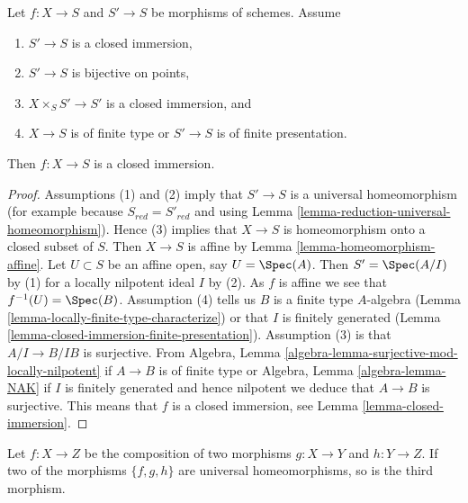 \begin{lemma}
\label{lemma-check-closed-infinitesimally}
Let $f : X \to S$ and $S' \to S$ be morphisms of schemes.
Assume
\begin{enumerate}
\item $S' \to S$ is a closed immersion,
\item $S' \to S$ is bijective on points,
\item $X \times_S S' \to S'$ is a closed immersion, and
\item $X \to S$ is of finite type or $S' \to S$ is of finite presentation.
\end{enumerate}
Then $f : X \to S$ is a closed immersion.
\end{lemma}

\begin{proof}
Assumptions (1) and (2) imply that $S' \to S$ is a universal homeomorphism
(for example because $S_{red} = S'_{red}$ and using
Lemma \ref{lemma-reduction-universal-homeomorphism}).
Hence (3) implies that $X \to S$ is homeomorphism onto a
closed subset of $S$. Then $X \to S$ is affine by
Lemma \ref{lemma-homeomorphism-affine}.
Let $U \subset S$ be an affine open, say $U = \Spec(A)$. Then $S' = \Spec(A/I)$
by (1) for a locally nilpotent ideal $I$ by (2). As $f$ is affine we see that
$f^{-1}(U) = \Spec(B)$.
Assumption (4) tells us $B$ is a finite type $A$-algebra
(Lemma \ref{lemma-locally-finite-type-characterize}) or
that $I$ is finitely generated
(Lemma \ref{lemma-closed-immersion-finite-presentation}).
Assumption (3) is that $A/I \to B/IB$ is surjective. From
Algebra, Lemma \ref{algebra-lemma-surjective-mod-locally-nilpotent}
if $A \to B$ is of finite type
or Algebra, Lemma \ref{algebra-lemma-NAK} if $I$ is finitely generated
and hence nilpotent we deduce that $A \to B$ is surjective.
This means that $f$ is a closed immersion, see
Lemma \ref{lemma-closed-immersion}.
\end{proof}

\begin{lemma}
\label{lemma-permanence-universal-homeomorphism}
Let $f : X \to Z$ be the composition of two morphisms 
$g : X \to Y$ and $h : Y \to Z$.
If two of the morphisms $\{f, g, h\}$ are universal homeomorphisms,
so is the third morphism.
\end{lemma}

